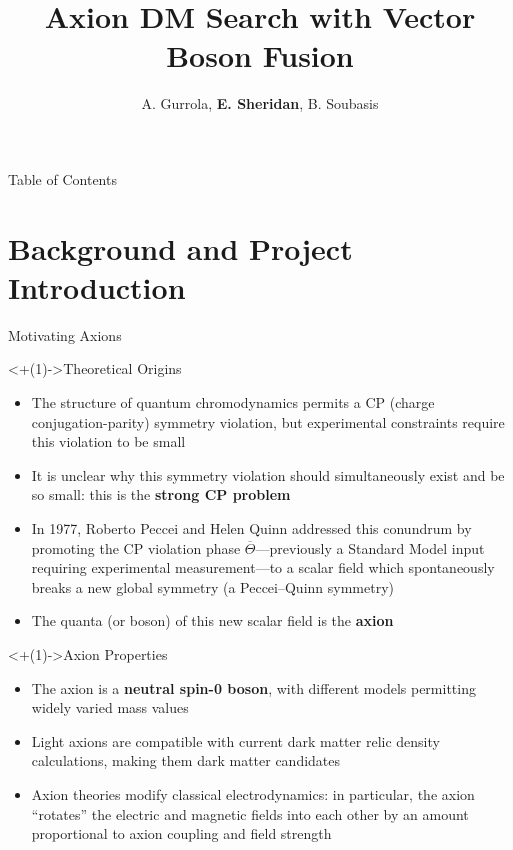 \documentclass[]{beamer}
\title[VBF Axion DM Search]{Axion DM Search with Vector Boson Fusion}
\author[E. Sheridan]{A. Gurrola\inst{1}, \textbf{E. Sheridan}\inst{1}, B. Soubasis\inst{1}}
\institute{Vanderbilt University\inst{1}}
\begin{document}
\frame{\titlepage}

\begin{frame}{Table of Contents}
\tableofcontents
\end{frame}



%
%
\section{Background and Project Introduction}

\begin{frame}{Motivating Axions}
    \begin{block}<+(1)->{Theoretical Origins}
        \begin{itemize}[<+(1)->]
            \item The structure of quantum chromodynamics permits a CP (charge conjugation-parity) symmetry violation, but experimental constraints require this violation to be small 
            \item It is unclear why this symmetry violation should simultaneously exist and be so small: this is the \textbf{strong CP problem} 
            \item In 1977, Roberto Peccei and Helen Quinn addressed this conundrum by promoting the CP violation phase $\overline{\Theta}$---previously a Standard Model input requiring experimental measurement---to a scalar field which spontaneously breaks a new global symmetry (a Peccei–Quinn symmetry)
            \item The quanta (or boson) of this new scalar field is the \textbf{axion}
        \end{itemize}
    \end{block}
    \begin{block}<+(1)->{Axion Properties}
        \begin{itemize}[<+(1)->]
            \item The axion is a \textbf{neutral spin-0 boson}, with different models permitting widely varied mass values
            \item Light axions are compatible with current dark matter relic density calculations, making them dark matter candidates
            \item Axion theories modify classical electrodynamics: in particular, the axion ``rotates'' the electric and magnetic fields into each other by an amount proportional to axion coupling and field strength 

\end{itemize}
\end{block}
\end{frame}
\end{document}
